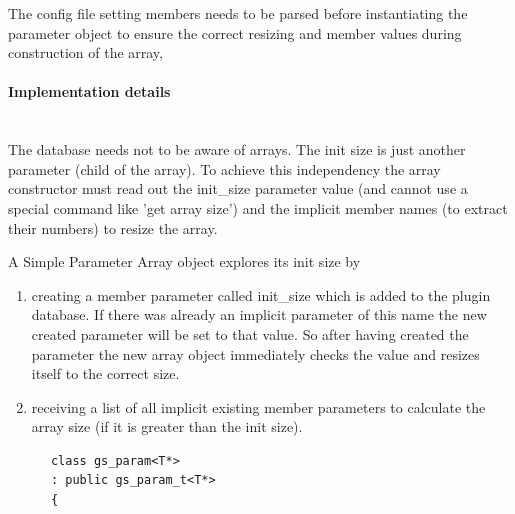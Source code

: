 The config file setting members needs to be parsed before instantiating the parameter object to ensure the correct resizing and member values during construction of the array,



\paragraph{Implementation details} ~\\

The database needs not to be aware of arrays. The init size is just another parameter (child of the array). To achieve this independency the array constructor must read out the \textsf{init\_size} parameter value (and cannot use a special command like 'get array size') and the implicit member names (to extract their numbers) to resize the array.

A Simple Parameter Array object explores its init size by
\begin{enumerate}
	\item creating a member parameter called \textsf{init\_size} which is added to the plugin database. If there was already an implicit parameter of this name the new created parameter will be set to that value. So after having created the parameter the new array object immediately checks the value and resizes itself to the correct size.
	\item receiving a list of all implicit existing member parameters to calculate the array size (if it is greater than the init size).
\end{enumerate}

\vspace{.3 cm}

\begin{lstlisting}
      class gs_param<T*>
      : public gs_param_t<T*>
      {
\end{lstlisting}

